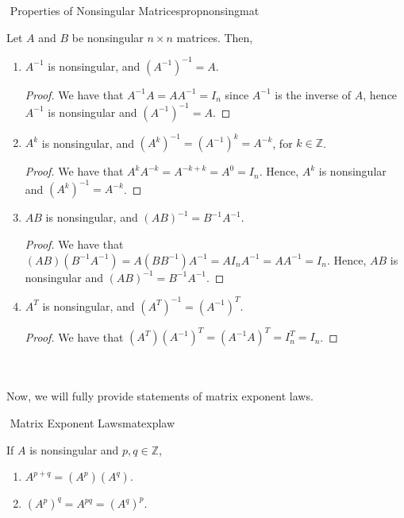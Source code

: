         \begin{theorem}{\Stop\,\,Properties of Nonsingular Matrices}{propnonsingmat}

            Let \(A\) and \(B\) be nonsingular \(n\times n\) matrices. Then,
            \begin{enumerate}
                \item \(A^{-1}\) is nonsingular, and \((A^{-1})^{-1}=A\).
                \begin{proof}
                    We have that \(A^{-1}A=AA^{-1}=I_n\) since \(A^{-1}\) is the inverse of \(A\), hence \(A^{-1}\) is nonsingular and \((A^{-1})^{-1}=A\).
                \end{proof}
                \item \(A^k\) is nonsingular, and \((A^k)^{-1}=(A^{-1})^k=A^{-k}\), for \(k\in\mathbb{Z}\).
                \begin{proof}
                    We have that \(A^kA^{-k}=A^{-k+k}=A^0=I_n\). Hence, \(A^k\) is nonsingular and \((A^k)^{-1}=A^{-k}\).
                \end{proof}
                \item \(AB\) is nonsingular, and \((AB)^{-1}=B^{-1}A^{-1}\).
                \begin{proof}
                    We have that \((AB)(B^{-1}A^{-1})=A(BB^{-1})A^{-1}=AI_nA^{-1}=AA^{-1}=I_n\). Hence, \(AB\) is nonsingular and \((AB)^{-1}=B^{-1}A^{-1}\).
                \end{proof}
                \item \(A^T\) is nonsingular, and \((A^T)^{-1}=(A^{-1})^T\).
                \begin{proof}
                    We have that \((A^T)(A^{-1})^T=(A^{-1}A)^T=I_n^T=I_n\).
                \end{proof}
            \end{enumerate}
            
        \end{theorem}
        \vphantom
        \\
        \\
        Now, we will fully provide statements of matrix exponent laws.
        \begin{theorem}{\Stop\,\,Matrix Exponent Laws}{matexplaw}

            If \(A\) is nonsingular and \(p,q\in\mathbb{Z}\),
            \begin{enumerate}
                \item \(A^{p+q}=(A^p)(A^q)\).
                \item \((A^p)^q=A^{pq}=(A^q)^p\).
            \end{enumerate}
            
        \end{theorem}
